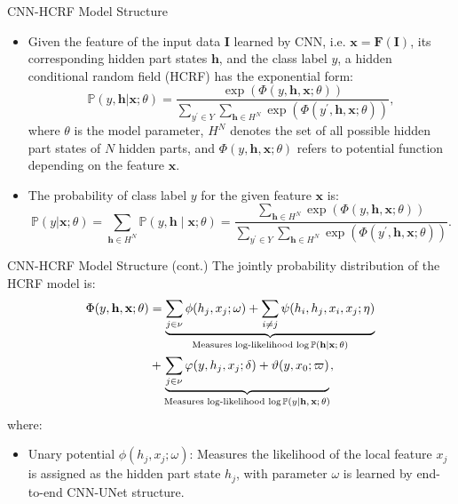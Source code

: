 \documentclass[leqno]{beamer}
\newcommand{\PP}{{\mathbb{P}}}
\newcommand{\Fb}{\mathbf{F}}
\newcommand{\Ib}{\mathbf{I}}
\newcommand{\hb}{\mathbf{h}}
\newcommand{\xb}{\mathbf{x}}
\begin{document}
\begin{frame}{CNN-HCRF Model Structure}
\begin{itemize}
\item Given the feature of the input data $\Ib$ learned by CNN, i.e.
$\xb = \Fb(\Ib)$, its corresponding hidden part states $\hb$, and the class
label $y$, a hidden conditional random field (HCRF) has the exponential form:
\begin{equation*}
\PP(y, \hb \vert \xb; \theta)
= \frac{\exp\left(\Phi(y, \hb, \xb; \theta)\right)}
{\sum_{y^\prime \in Y} \sum_{\hb \in H^N}
\exp\left(\Phi(y^\prime, \hb, \xb; \theta)\right)},
\end{equation*}
where $\theta$ is the model parameter, $H^N$ denotes the set of all possible
hidden part states of $N$ hidden parts, and $\Phi(y, \hb, \xb; \theta)$
refers to potential function depending on the feature $\xb$.
\item The probability of class label $y$ for the given feature $\xb$ is:
\begin{equation*}
\PP(y \vert \xb; \theta) = \sum_{\hb \in H^N} \PP(y, \hb \mid \xb; \theta)
= \frac{\sum_{\hb \in H^N} \exp\left(\Phi(y, \hb, \xb; \theta)\right)}
{\sum_{y^\prime \in Y} \sum_{\hb \in H^N}
\exp\left(\Phi(y^\prime, \hb, \xb; \theta)\right)}.
\end{equation*}
\end{itemize}
\end{frame}


\begin{frame}{CNN-HCRF Model Structure (cont.)}
The jointly probability distribution of the HCRF model is:
\begin{align*}
\Phi(y, \hb, \xb; \theta) &= \underbrace{
\sum_{j \in \nu} \phi(h_j, x_j; \omega) +
\sum_{i \neq j} \psi(h_i, h_j, x_i, x_j; \eta)}_{
\textrm{Measures log-likelihood $\log\PP(\hb \vert \xb; \theta)$}} \\
& + \underbrace{
\sum_{j \in \nu} \varphi(y, h_j, x_j; \delta) + \vartheta(y, x_0; \varpi)}_{
\textrm{Measures log-likelihood $\log\PP(y \vert \hb, \xb; \theta)$}},
\end{align*}
where:
\begin{itemize}
\item Unary potential $\phi(h_j, x_j; \omega)$: Measures the likelihood of the
local feature $x_j$ is assigned as the hidden part state $h_j$, with parameter
$\omega$ is learned by end-to-end CNN-UNet structure.
\end{itemize}
\end{frame}
\end{document}
